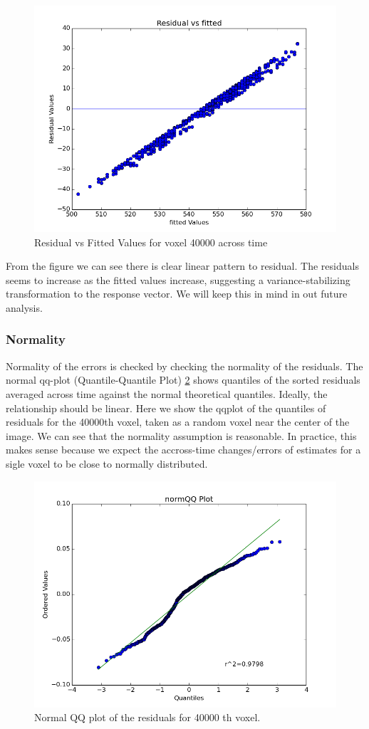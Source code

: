 \begin{figure}[ht]
\centering
\includegraphics[scale=0.5]{figures/res_fittedval}  
\caption{Residual vs Fitted Values for voxel 40000 across time}
\label{fig:residual_vs_fitted}
\end{figure}

From the figure we can see there is clear linear pattern to residual. The
residuals seems to increase as the fitted values increase, suggesting a 
variance-stabilizing transformation to the response vector. We will keep this 
in mind in out future analysis. 

\subsubsection{Normality}
Normality of the errors is checked by checking the normality of the residuals. 
The normal qq-plot (Quantile-Quantile Plot) \ref{fig:qqplot} shows quantiles
of the sorted residuals averaged across time against the normal theoretical 
quantiles. Ideally, the relationship should be linear. Here we show the qqplot
of the quantiles of residuals for the 40000th voxel, taken as a random voxel 
near the center of the image. We can see that the normality assumption is 
reasonable. In practice, this makes sense because we expect the accross-time
changes/errors of estimates for a sigle voxel to be close to normally 
distributed.

\begin{figure}[ht]
\centering
\includegraphics[scale=0.5]{figures/qqplot}  
\caption{Normal QQ plot of the residuals for 40000 th voxel.}
\label{fig:qqplot}
\end{figure}



